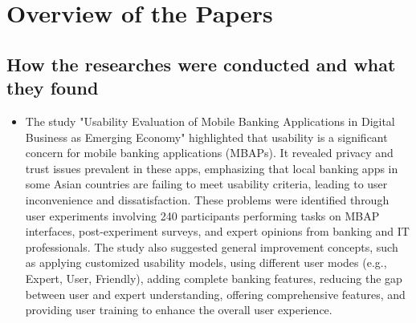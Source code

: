 \documentclass[a4paper,12pt]{report}
\begin{document}
\section{Overview of the Papers}
\subsection{How the researches were conducted and what they found}
\begin{itemize}
  \item The study "Usability Evaluation of Mobile Banking Applications in Digital Business as Emerging Economy" highlighted that usability is a significant concern for mobile banking applications (MBAPs). It revealed privacy and trust issues prevalent in these apps, emphasizing that local banking apps in some Asian countries are failing to meet usability criteria, leading to user inconvenience and dissatisfaction. These problems were identified through user experiments involving 240 participants performing tasks on MBAP interfaces, post-experiment surveys, and expert opinions from banking and IT professionals. The study also suggested general improvement concepts, such as applying customized usability models, using different user modes (e.g., Expert, User, Friendly), adding complete banking features, reducing the gap between user and expert understanding, offering comprehensive features, and providing user training to enhance the overall user experience.

\end{itemize}
\end{document}
